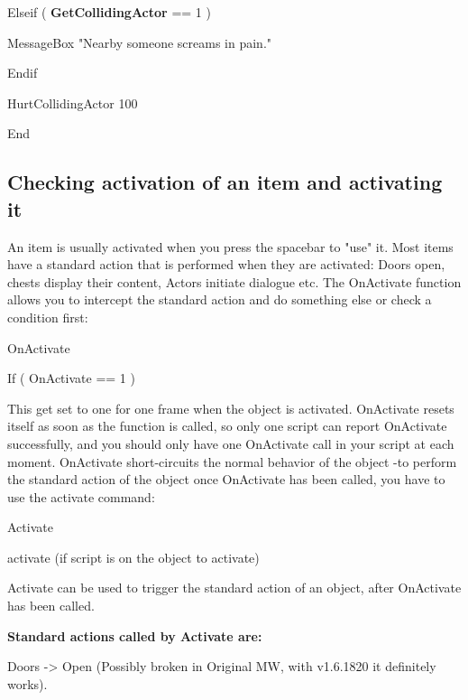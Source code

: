 \documentclass[
]{article}
\begin{document}
Elseif ( \textbf{GetCollidingActor} == 1 )

MessageBox "Nearby someone screams in pain."

Endif

HurtCollidingActor 100

End

\hypertarget{section-3}{%
\subsection{}\label{section-3}}

\hypertarget{section-4}{%
\subsection{}\label{section-4}}

\hypertarget{checking-activation-of-an-item-and-activating-it}{%
\subsection{Checking activation of an item and activating
it}\label{checking-activation-of-an-item-and-activating-it}}

An item is usually activated when you press the spacebar to "use" it.
Most items have a standard action that is performed when they are
activated: Doors open, chests display their content, Actors initiate
dialogue etc. The OnActivate function allows you to intercept the
standard action and do something else or check a condition first:

OnActivate

If ( OnActivate == 1 )

This get set to one for one frame when the object is activated.
OnActivate resets itself as soon as the function is called, so only one
script can report OnActivate successfully, and you should only have one
OnActivate call in your script at each moment. OnActivate short-circuits
the normal behavior of the object -to perform the standard action of the
object once OnActivate has been called, you have to use the activate
command:

Activate

activate (if script is on the object to activate)

Activate can be used to trigger the standard action of an object, after
OnActivate has been called.

\textbf{Standard actions called by Activate are:}

Doors -\textgreater{} Open (Possibly broken in Original MW, with
v1.6.1820 it definitely works).
\end{document}
